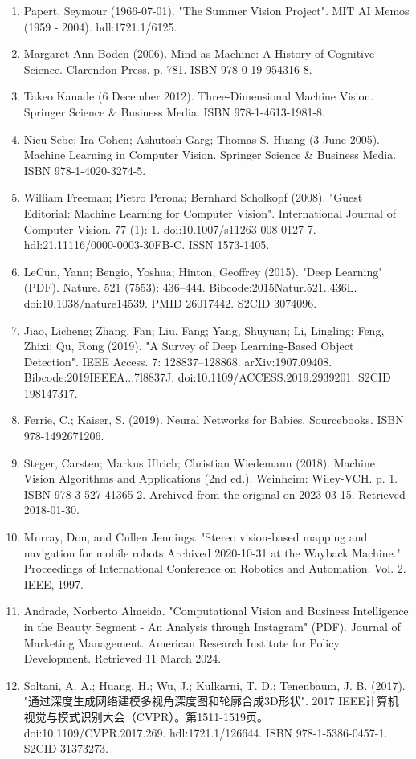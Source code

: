 \begin{enumerate}
\item Papert, Seymour (1966-07-01). "The Summer Vision Project". MIT AI Memos (1959 - 2004). hdl:1721.1/6125.
\item Margaret Ann Boden (2006). Mind as Machine: A History of Cognitive Science. Clarendon Press. p. 781. ISBN 978-0-19-954316-8.
\item Takeo Kanade (6 December 2012). Three-Dimensional Machine Vision. Springer Science & Business Media. ISBN 978-1-4613-1981-8.
\item Nicu Sebe; Ira Cohen; Ashutosh Garg; Thomas S. Huang (3 June 2005). Machine Learning in Computer Vision. Springer Science & Business Media. ISBN 978-1-4020-3274-5.
\item William Freeman; Pietro Perona; Bernhard Scholkopf (2008). "Guest Editorial: Machine Learning for Computer Vision". International Journal of Computer Vision. 77 (1): 1. doi:10.1007/s11263-008-0127-7. hdl:21.11116/0000-0003-30FB-C. ISSN 1573-1405.
\item LeCun, Yann; Bengio, Yoshua; Hinton, Geoffrey (2015). "Deep Learning" (PDF). Nature. 521 (7553): 436–444. Bibcode:2015Natur.521..436L. doi:10.1038/nature14539. PMID 26017442. S2CID 3074096.
\item Jiao, Licheng; Zhang, Fan; Liu, Fang; Yang, Shuyuan; Li, Lingling; Feng, Zhixi; Qu, Rong (2019). "A Survey of Deep Learning-Based Object Detection". IEEE Access. 7: 128837–128868. arXiv:1907.09408. Bibcode:2019IEEEA...7l8837J. doi:10.1109/ACCESS.2019.2939201. S2CID 198147317.
\item Ferrie, C.; Kaiser, S. (2019). Neural Networks for Babies. Sourcebooks. ISBN 978-1492671206.
\item Steger, Carsten; Markus Ulrich; Christian Wiedemann (2018). Machine Vision Algorithms and Applications (2nd ed.). Weinheim: Wiley-VCH. p. 1. ISBN 978-3-527-41365-2. Archived from the original on 2023-03-15. Retrieved 2018-01-30.
\item Murray, Don, and Cullen Jennings. "Stereo vision-based mapping and navigation for mobile robots Archived 2020-10-31 at the Wayback Machine." Proceedings of International Conference on Robotics and Automation. Vol. 2. IEEE, 1997.
\item Andrade, Norberto Almeida. "Computational Vision and Business Intelligence in the Beauty Segment - An Analysis through Instagram" (PDF). Journal of Marketing Management. American Research Institute for Policy Development. Retrieved 11 March 2024.
\item Soltani, A. A.; Huang, H.; Wu, J.; Kulkarni, T. D.; Tenenbaum, J. B. (2017). "通过深度生成网络建模多视角深度图和轮廓合成3D形状". 2017 IEEE计算机视觉与模式识别大会（CVPR）。第1511-1519页。doi:10.1109/CVPR.2017.269. hdl:1721.1/126644. ISBN 978-1-5386-0457-1. S2CID 31373273.

\end{enumerate}
